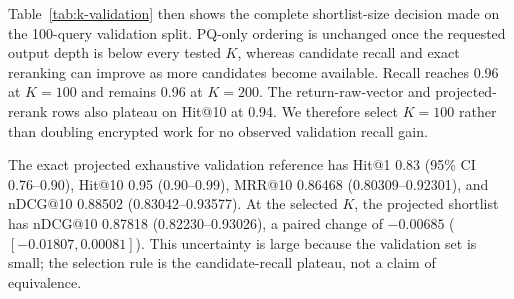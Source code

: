 \documentclass[pdflatex,sn-basic,Numbered]{sn-jnl}
\theoremstyle{plain}
\begin{document}
Table~\ref{tab:k-validation} then shows the complete shortlist-size decision made on the 100-query validation split. PQ-only ordering is unchanged once the requested output depth is below every tested $K$, whereas candidate recall and exact reranking can improve as more candidates become available. Recall reaches 0.96 at $K=100$ and remains 0.96 at $K=200$. The return-raw-vector and projected-rerank rows also plateau on Hit@10 at 0.94. We therefore select $K=100$ rather than doubling encrypted work for no observed validation recall gain.

\begin{table}[t]
\caption{Validation-only shortlist sweep on the one-million-vector self-retrieval diagnostic. Values are means over 100 queries. This table was used to freeze $K=100$ before the held-out test.}\label{tab:k-validation}
\centering
\small
{}
\end{table}

The exact projected exhaustive validation reference has Hit@1 0.83 (95\% CI 0.76--0.90), Hit@10 0.95 (0.90--0.99), MRR@10 0.86468 (0.80309--0.92301), and nDCG@10 0.88502 (0.83042--0.93577). At the selected $K$, the projected shortlist has nDCG@10 0.87818 (0.82230--0.93026), a paired change of $-0.00685$ ($[-0.01807,0.00081]$). This uncertainty is large because the validation set is small; the selection rule is the candidate-recall plateau, not a claim of equivalence.
\end{document}
